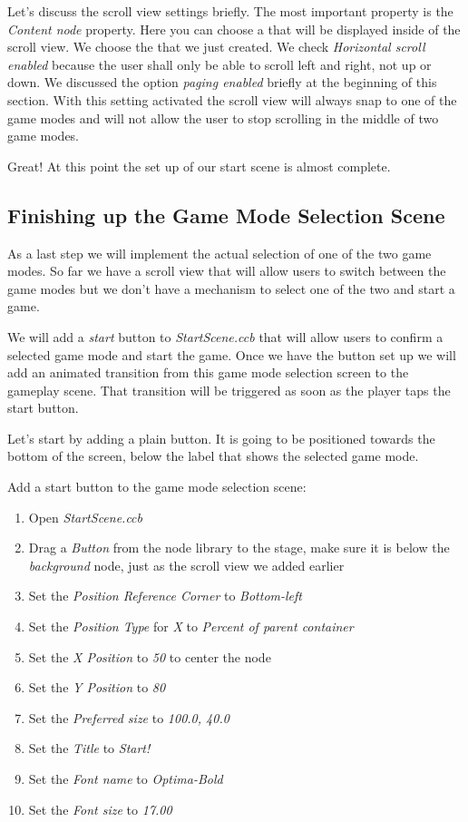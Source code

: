 Let's discuss the scroll view settings briefly. The most important property is
the \textit{Content node} property. Here you can choose a \ccbfile{} that will
be displayed inside of the scroll view. We choose the
 that we just created. We check
\textit{Horizontal scroll enabled} because the user shall only be able to scroll
left and right, not up or down. We discussed the option \textit{paging enabled}
briefly at the beginning of this section. With this setting activated the scroll
view will always snap to one of the game modes and will not allow the user to
stop scrolling in the middle of two game modes.

Great! At this point the set up of our start scene is almost complete.

\subsection{Finishing up the Game Mode Selection Scene}
As a last step we will implement the actual selection of one of the two game
modes. So far we have a scroll view that will allow users to switch between the
game modes but we don't have a mechanism to select one of the two and start a
game.

We will add a \textit{start} button to \textit{StartScene.ccb} that will
allow users to confirm a selected game mode and start the game. Once we have the button set up we will
add an animated transition from this game mode selection screen to the gameplay
scene. That transition will be triggered as soon as the player taps the start
button.

Let's start by adding a plain button. It is going to be positioned towards
the bottom of the screen, below the label that shows the selected game mode.

\begin{leftbar}
Add a start button to the game mode selection scene:
\begin{enumerate}
  \item Open \textit{StartScene.ccb} 
  \item Drag a \textit{Button} from the node library to
the stage, make sure it is below the \textit{background} node, just as the
scroll view we added earlier
  \item Set the \textit{Position Reference Corner} to \textit{Bottom-left}
  \item Set the \textit{Position Type} for \textit{X} to \textit{Percent of
  parent container}
  \item Set the \textit{X Position} to \textit{50} to center the node
  \item Set the \textit{Y Position} to \textit{80}
  \item Set the \textit{Preferred size} to \textit{100.0, 40.0}
  \item Set the \textit{Title} to \textit{Start!}
  \item Set the \textit{Font name} to \textit{Optima-Bold}
  \item Set the \textit{Font size} to \textit{17.00} 
\end{enumerate}
\end{leftbar}

